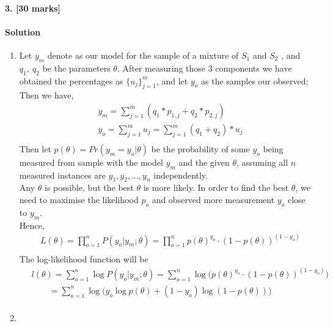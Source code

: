 \documentclass[a4paper]{scrartcl}
\begin{document}
\paragraph{3. [30 marks]}
\label{sec:Question 3}
\paragraph{Solution}
\begin{enumerate}[label=(\arabic*)]
  \item
  Let $y_m$ denote as our model for the sample of a mixture of $S_1$ and $S_2$ , and $q_1,\ q_2$ be the parameters $\theta$. After measuring those 3 components we have obtained the percentages as ${\{u_j\}_{j=1}^{m}}$, and let  $y_o$ as the samples our observed;
  Then we have,
  \begin{align*}
    &\ y_m = \sum_{j=1}^{m} (q_1* p_{1,j} + q_2* p_{2,j})\\ &\
     y_o = \sum_{j=1}^{m} u_j = \sum_{j=1}^{m} (q_1+q_2)*u_j\\ &\
  \end{align*}
  Then let $p(\theta)=Pr(y_m=y_o|\theta)$ be the probability of some $y_o$ being measured from sample with the model $y_m$ and the given $\theta$, assuming all $n$ measured instances are $y_1,y_2,...,y_n$ independently. \\
  Any $\theta$ is possible, but the best $\theta$ is more likely. In order to find the best $\theta$, we need to maximise the likelihood $p_o$ and observed more measurement $y_o$ close to $y_m$.\\Hence,
  \begin{align*}
   &\ L(\theta)=\prod_{o=1}^{n}P(y_o|y_m;\theta)=\prod_{o=1}^{n}p(\theta)^{y_o} \cdot (1-p(\theta))^{(1-y_o)} \\ &\
  \end{align*}
  The log-likelihood function will be\\
  \begin{align*}
   &\ l(\theta)=\sum_{o=1}^{n}\log{P(y_o|y_m;\theta)}=\sum_{o=1}^{n}\log{\bigg(p(\theta)^{y_o} \cdot (1-p(\theta))^{(1-y_o)}\bigg)}\\ 
   &\ \qquad=\sum_{o=1}^{n}\log{\bigg(y_o\log{p(\theta)} +(1-y_o) \log{(1-p(\theta))}\bigg)}\\ &\
  \end{align*}
  \item
\end{enumerate}
\end{document}
